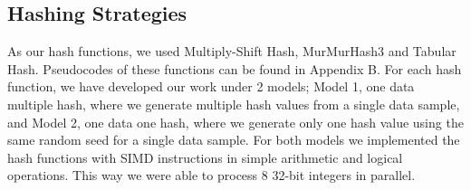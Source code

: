 \documentclass[a0,portrait]{a0poster}
\begin{document}
\begin{minipage}[c]{\linewidth}
\begin{framed}
\begin{multicols}{2}



\color{Black}
\section{Hashing Strategies}
As our hash functions, we used Multiply-Shift Hash, MurMurHash3  and Tabular Hash. Pseudocodes of these functions can be found in Appendix B. For each hash function, we have developed our work under 2 models; Model 1, one data multiple hash, where we generate multiple hash values from a single data sample, and Model 2, one data one hash, where we generate only one hash value using the same random seed for a single data sample. For both models we implemented the hash functions with SIMD instructions in simple arithmetic and logical operations. This way we were able to process 8 32-bit integers in parallel.

\end{multicols}
\end{framed}
\end{minipage}
\end{document}
